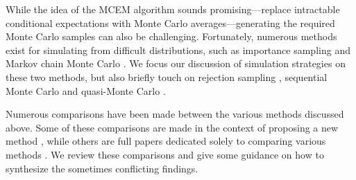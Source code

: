 \documentclass[11pt, oneside]{article}   	%
\begin{document}


While the idea of the MCEM algorithm sounds promising---replace intractable conditional expectations with Monte Carlo averages---generating the required Monte Carlo samples can also be challenging. Fortunately, numerous methods exist for simulating from difficult distributions, such as importance sampling \citep{Rob04} and Markov chain Monte Carlo \citep{Gel13}. We focus our discussion of simulation strategies on these two methods, but also briefly touch on rejection sampling \citep{Rob04}, sequential Monte Carlo \citep{Del06} and quasi-Monte Carlo \citep{Caf98}.

Numerous comparisons have been made between the various methods discussed above. Some of these comparisons are made in the context of proposing a new method \citep[e.g.,][]{Gu98I,Boo99}, while others are full papers dedicated solely to comparing various methods \citep[e.g.,][]{McC97,Boo01}. We review these comparisons and give some guidance on how to synthesize the sometimes conflicting findings. 

\end{document}
